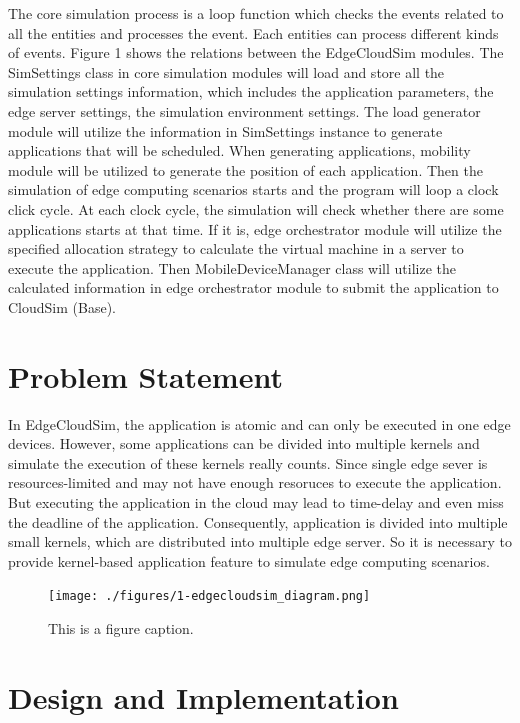 The core simulation process is a loop function which checks the events related to all the entities and processes the event. Each entities can process different kinds of events. Figure 1 shows the relations between the EdgeCloudSim modules. The SimSettings class in core simulation modules will load and store all the simulation settings information, which includes the application parameters, the edge server settings, the simulation environment settings. The load generator module will utilize the information in SimSettings instance to generate applications that will be scheduled. When generating applications, mobility module will be utilized to generate the position of each application. Then the simulation of edge computing scenarios starts and the program will loop a clock click cycle. At each clock cycle, the simulation will check whether there are some applications starts at that time. If it is, edge orchestrator module will utilize the specified allocation strategy to calculate the virtual machine in a server to execute the application. Then MobileDeviceManager class will utilize the calculated information in edge orchestrator module to submit the application to CloudSim (Base).

\section{Problem Statement}
In EdgeCloudSim, the application is atomic and can only be executed in one edge devices. However, some applications can be divided into multiple kernels and simulate the execution of these kernels really counts. Since single edge sever is resources-limited and may not have enough resoruces to execute the application. But executing the application in the cloud may lead to time-delay and even miss the deadline of the application.  Consequently, application is divided into multiple small kernels, which are distributed into multiple edge server. So it is necessary to provide kernel-based application feature to simulate edge computing scenarios.


\begin{figure}
	\centering
	\texttt{[image: ./figures/1-edgecloudsim\_diagram.png]}
	\caption{\label{fig:frog}This is a figure caption.}
\end{figure}


\section{Design and Implementation}

